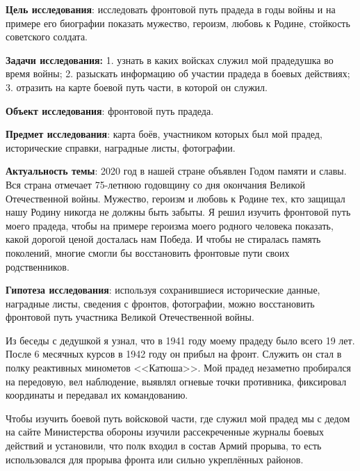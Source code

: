 


\makeProcTitleSchool



\textbf{Цель исследования}: исследовать фронтовой путь прадеда в годы войны и на примере его биографии показать мужество, героизм, любовь к Родине, стойкость советского солдата.

\textbf{Задачи исследования:} 1. узнать в каких войсках служил мой прадедушка во время войны; 2. разыскать информацию об участии прадеда в боевых действиях; 3. отразить на карте боевой путь части, в которой он служил.

\textbf{Объект исследования}: фронтовой путь прадеда.

\textbf{Предмет исследования}: карта боёв, участником которых был мой прадед, исторические справки, наградные листы, фотографии.

\textbf{Актуальность темы}: 2020 год в нашей стране объявлен Годом памяти и славы. Вся страна отмечает 75-летнюю годовщину со дня окончания Великой Отечественной войны. Мужество, героизм и любовь к Родине тех, кто защищал нашу Родину никогда не должны быть забыты. Я решил изучить фронтовой путь моего прадеда, чтобы на примере героизма моего родного человека показать, какой дорогой ценой досталась нам Победа. И чтобы не стиралась память поколений, многие смогли бы восстановить фронтовые пути своих родственников.

\textbf{Гипотеза исследования}: используя сохранившиеся исторические данные, наградные листы, сведения с фронтов, фотографии, можно восстановить фронтовой путь участника Великой Отечественной войны.

Из беседы с дедушкой я узнал, что в 1941 году моему прадеду было всего 19 лет. После 6 месячных курсов в 1942 году он прибыл на фронт. Служить он стал в полку реактивных минометов <<Катюша>>. Мой прадед незаметно пробирался на передовую, вел наблюдение, выявлял огневые точки противника, фиксировал координаты и передавал их командованию.

Чтобы изучить боевой путь войсковой части, где служил мой прадед мы с дедом на сайте Министерства обороны изучили рассекреченные журналы боевых действий и установили, что полк входил в состав Армий прорыва, то есть использовался для прорыва фронта или сильно укреплённых районов.

